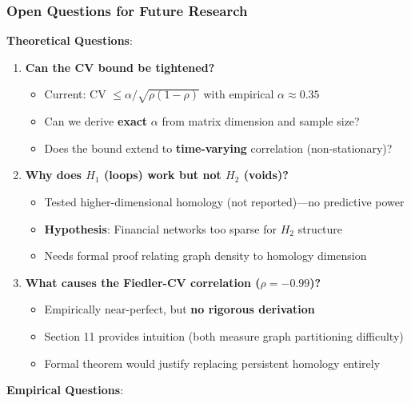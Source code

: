 \subsubsection{Open Questions for Future Research}

\textbf{Theoretical Questions}:

\begin{enumerate}
\item \textbf{Can the CV bound be tightened?}
   \begin{itemize}
   \item Current: CV $\leq \alpha/\sqrt{\rho(1-\rho)}$ with empirical $\alpha \approx 0.35$
   \item Can we derive \textbf{exact} $\alpha$ from matrix dimension and sample size?
   \item Does the bound extend to \textbf{time-varying} correlation (non-stationary)?
   \end{itemize}

\item \textbf{Why does $H_1$ (loops) work but not $H_2$ (voids)?}
   \begin{itemize}
   \item Tested higher-dimensional homology (not reported)---no predictive power
   \item \textbf{Hypothesis}: Financial networks too sparse for $H_2$ structure
   \item Needs formal proof relating graph density to homology dimension
   \end{itemize}

\item \textbf{What causes the Fiedler-CV correlation ($\rho = -0.99$)?}
   \begin{itemize}
   \item Empirically near-perfect, but \textbf{no rigorous derivation}
   \item Section 11 provides intuition (both measure graph partitioning difficulty)
   \item Formal theorem would justify replacing persistent homology entirely
   \end{itemize}
\end{enumerate}

\textbf{Empirical Questions}:

